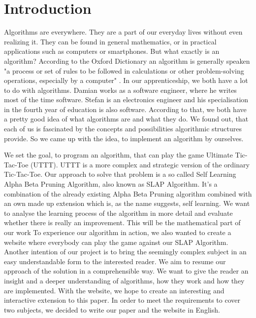 \section{Introduction}
Algorithms are everywhere. They are a part of our everyday lives without even realizing it. They can be found in general mathematics, or in practical applications such as  computers or smartphones. But what exactly is an algorithm? According to the Oxford Dictionary an algorithm is generally speaken "a process or set of rules to be followed in calculations or other problem-solving operations, especially by a computer" \cite{web:oxforddictionaries2018}.
In our apprenticeship, we both have a lot to do with algorithms. Damian works as a software engineer, where he writes most of the time software. Stefan is an electronics engineer and his specialisation in the fourth year of education is also software. According to that, we both have a pretty good idea of what algorithms are and what they do. We found out, that each of us is fascinated by the concepts and possibilities algorithmic structures provide. So we came up with the idea, to implement an algorithm by ourselves. \bigskip

We set the goal, to program an algorithm, that can play the game Ultimate Tic-Tac-Toe (UTTT). UTTT is a more complex and strategic version of the ordinary Tic-Tac-Toe. 
Our approach to solve that problem is a so called Self Learning Alpha Beta Pruning Algorithm, also known as SLAP Algorithm. It's a combination of the already existing Alpha Beta Pruning algorithm combined with an own made up extension which is, as the name suggests, self learning. We want to analyse the learning process of the algorithm in more detail and evaluate whether there is really an improvement. This will be the mathematical part of our work
To experience our algorithm in action, we also wanted to create a website where everybody can play the game against our SLAP Algorithm.
Another intention of our project is to bring the seemingly complex subject in an easy understandable form to the interested reader. We aim to resume our approach of the solution in a comprehensible way. We want to give the reader an insight and a deeper understanding of algorithms, how they work and how they are implemented. With the website, we hope to create an interesting and interactive extension to this paper.
In order to meet the requirements to cover two subjects, we decided to write our paper and the website in English. \vspace{8mm}

